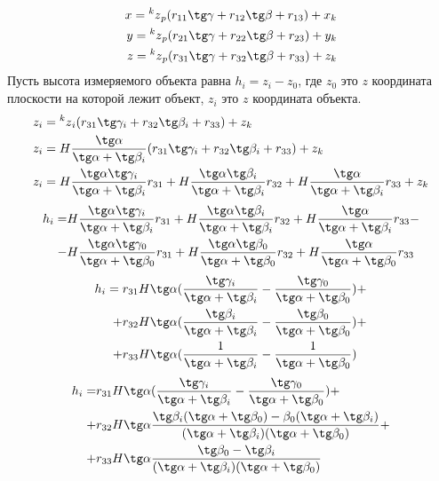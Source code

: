 \documentclass[a4paper, 12pt]{article}
\begin{document}
				\[
				\begin{split}
					x = \prescript{k}{}{z}_p(r_{11}\tg\gamma + r_{12}\tg\beta + r_{13}) + x_k\\
					y = \prescript{k}{}{z}_p(r_{21}\tg\gamma + r_{22}\tg\beta + r_{23}) + y_k\\
					z = \prescript{k}{}{z}_p(r_{31}\tg\gamma + r_{32}\tg\beta + r_{33}) + z_k\\
				\end{split}
				\]
				Пусть высота измеряемого объекта равна $h_i = z_i - z_0$, где $z_0$ это $z$ координата плоскости на которой лежит объект, $z_i$ это $z$ координата объекта.
				\[
				\begin{split}
					z_i &= \prescript{k}{}{z}_i(r_{31}\tg\gamma_i + r_{32}\tg\beta_i + r_{33}) + z_k\\
					z_i &= H\frac{\tg\alpha}{\tg\alpha+\tg\beta_i}(r_{31}\tg\gamma_i + r_{32}\tg\beta_i + r_{33}) + z_k\\
					z_i &= H\frac{\tg\alpha\tg\gamma_i}{\tg\alpha+\tg\beta_i}r_{31} + H\frac{\tg\alpha\tg\beta_i}{\tg\alpha+\tg\beta_i}r_{32} + H\frac{\tg\alpha}{\tg\alpha+\tg\beta_i}r_{33} + z_k
				\end{split}
				\]
				\[
				\begin{split}
				h_i = &H\frac{\tg\alpha\tg\gamma_i}{\tg\alpha+\tg\beta_i}r_{31} + H\frac{\tg\alpha\tg\beta_i}{\tg\alpha+\tg\beta_i}r_{32} + H\frac{\tg\alpha}{\tg\alpha+\tg\beta_i}r_{33}-\\ 
					- &H\frac{\tg\alpha\tg\gamma_0}{\tg\alpha+\tg\beta_0}r_{31} + H\frac{\tg\alpha\tg\beta_0}{\tg\alpha+\tg\beta_0}r_{32} + H\frac{\tg\alpha}{\tg\alpha+\tg\beta_0}r_{33}
				\end{split}
				\]
				\[
				\begin{split}
				h_i = r_{31} H \tg\alpha (\frac{\tg\gamma_i}{\tg\alpha+\tg\beta_i} &- \frac{\tg\gamma_0}{\tg\alpha+\tg\beta_0})+\\
					+ r_{32} H \tg\alpha (\frac{\tg\beta_i}{\tg\alpha+\tg\beta_i} &- \frac{\tg\beta_0}{\tg\alpha+\tg\beta_0})+\\
					+ r_{33} H \tg\alpha (\frac{1}{\tg\alpha+\tg\beta_i} &- \frac{1}{\tg\alpha+\tg\beta_0})
				\end{split}
				\]
				\[
				\begin{split}
				h_i = &r_{31} H \tg\alpha (\frac{\tg\gamma_i}{\tg\alpha+\tg\beta_i} - \frac{\tg\gamma_0}{\tg\alpha+\tg\beta_0})+\\
					+ &r_{32} H \tg\alpha \frac{\tg\beta_i(\tg\alpha+\tg\beta_0)-\beta_0(\tg\alpha+\tg\beta_i)}{(\tg\alpha+\tg\beta_i)(\tg\alpha+\tg\beta_0)}+\\
					+ &r_{33} H \tg\alpha \frac{\tg\beta_0 - \tg\beta_i}{(\tg\alpha+\tg\beta_i)(\tg\alpha+\tg\beta_0)}
				\end{split}
				\]
\end{document}
